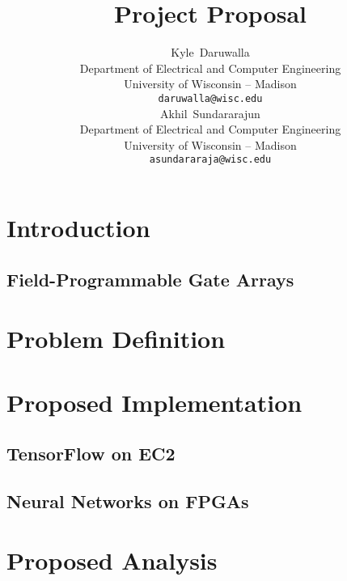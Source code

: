 \documentclass{article}
\title{Project Proposal}
\author{
    Kyle~Daruwalla \\
    Department of Electrical and Computer Engineering \\
    University of Wisconsin -- Madison \\
    \texttt{daruwalla@wisc.edu} \\
    \And
    Akhil~Sundararajun \\
    Department of Electrical and Computer Engineering \\
    University of Wisconsin -- Madison \\
    \texttt{asundararaja@wisc.edu} \\
}
\begin{document}
\maketitle


\section{Introduction}

\subsection{Field-Programmable Gate Arrays}


\section{Problem Definition}


\section{Proposed Implementation}

\subsection{TensorFlow on EC2}

\subsection{Neural Networks on FPGAs}


\section{Proposed Analysis}


\nocite{*}

\end{document}

